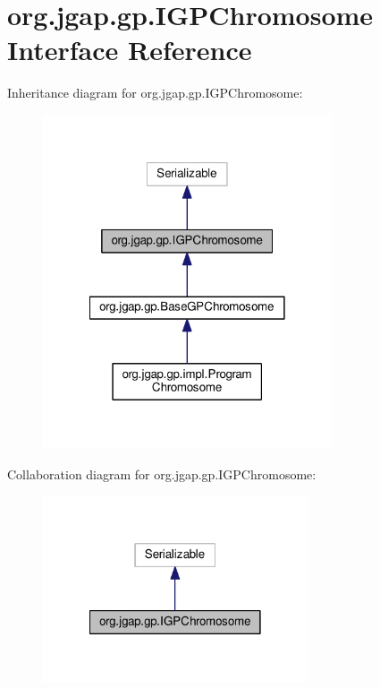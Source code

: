 \hypertarget{interfaceorg_1_1jgap_1_1gp_1_1_i_g_p_chromosome}{\section{org.\-jgap.\-gp.\-I\-G\-P\-Chromosome Interface Reference}
\label{interfaceorg_1_1jgap_1_1gp_1_1_i_g_p_chromosome}
}


Inheritance diagram for org.\-jgap.\-gp.\-I\-G\-P\-Chromosome\-:
\nopagebreak
\begin{figure}[H]
\begin{center}
\leavevmode
\includegraphics[width=242pt]{interfaceorg_1_1jgap_1_1gp_1_1_i_g_p_chromosome__inherit__graph}
\end{center}
\end{figure}


Collaboration diagram for org.\-jgap.\-gp.\-I\-G\-P\-Chromosome\-:
\nopagebreak
\begin{figure}[H]
\begin{center}
\leavevmode
\includegraphics[width=222pt]{interfaceorg_1_1jgap_1_1gp_1_1_i_g_p_chromosome__coll__graph}
\end{center}
\end{figure}
